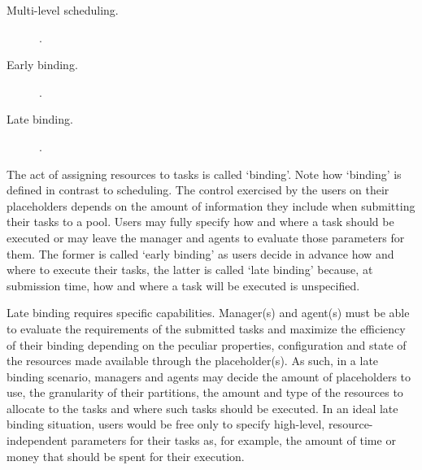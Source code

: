 \documentclass{sig-alternate}
\begin{document}
\begin{description}
  \item[Multi-level scheduling.] .
  \item[Early binding.] .
  \item[Late binding.] . 
\end{description}


  The act of assigning resources to tasks is called `binding'. Note how `binding' is defined in contrast to scheduling.    The control exercised by the users on their placeholders depends on the amount of information they include when submitting their tasks to a pool. Users may fully specify how and where a task should be executed or may leave the manager and agents to evaluate those parameters for them. The former is called `early binding' as users decide in advance how and where to execute their tasks, the latter is called `late binding' because, at submission time, how and where a task will be executed is unspecified.

Late binding requires specific capabilities. Manager(s) and agent(s) must be able to evaluate the requirements of the submitted tasks and maximize the efficiency of their binding depending on the peculiar properties, configuration and state of the resources made available through the placeholder(s). As such, in a late binding scenario, managers and agents may decide the amount of placeholders to use, the granularity of their partitions, the amount and type of the resources to allocate to the tasks and where such tasks should be executed. In an ideal late binding situation, users would be free only to specify high-level, resource-independent parameters for their tasks as, for example, the amount of time or money that should be spent for their execution. 

\end{document}
